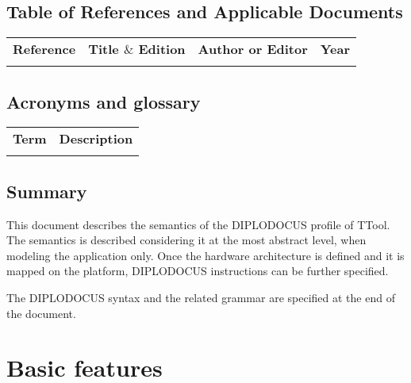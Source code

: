 \documentclass[12pt]{article}
\begin{document}
\subsection{Table of References and Applicable Documents}

\begin{table}[H]
\large
\centering
\begin{adjustbox}{width=\textwidth}
\begin{tabular}{ |p{2.66in}|p{2.66in}|p{0.95in}|p{0.43in}| }
\hhline{----}
\textbf{Reference} & \textbf{Title  $  \&  $  Edition} & \textbf{Author or
Editor} & \textbf{Year}
\\
\hhline{----}
 &  &  &  \\ 
\hline
\end{tabular}
\end{adjustbox}
\end{table}

\subsection{Acronyms and glossary}

\begin{table}[H]
\large
\centering
\begin{adjustbox}{width=\textwidth}
\begin{tabular}{ |p{1.24in}|p{5.45in}| }
\hhline{--}
\textbf{Term} & \textbf{Description} \\ 
\hhline{--}
 &  \\ 
\hline
\end{tabular}
\end{adjustbox}
\end{table}

\subsection{Summary}

This document describes the semantics of the DIPLODOCUS profile of TTool. The semantics is described considering it at the most abstract level, when modeling the application only. Once the hardware architecture is defined and it is mapped on the platform, DIPLODOCUS instructions can be further specified. 

The DIPLODOCUS syntax and the related grammar are specified at the end of the document.

\newpage

         


\section{Basic features}
\end{document}
